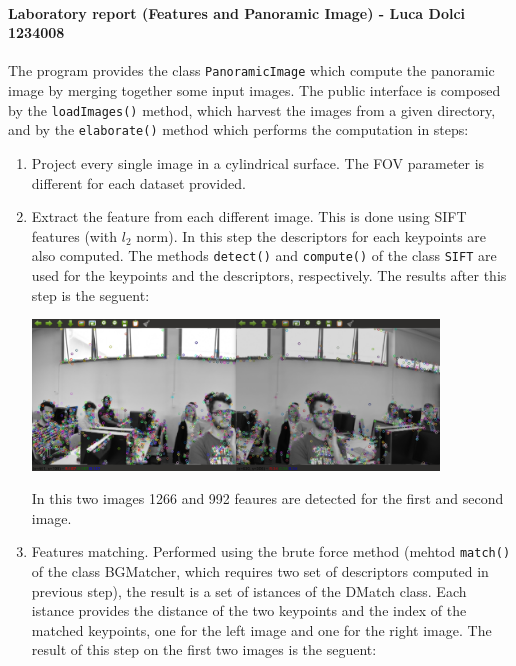 \documentclass[11pt, a4paper]{toptesi}
\begin{document}
\paragraph{Laboratory report (Features and Panoramic Image) - Luca Dolci 1234008}
The program provides the class \texttt{PanoramicImage} which compute the 
panoramic image by merging together some input images. The public
interface is composed by the \texttt{loadImages()} method, which
harvest the images from a given directory, and by the
\texttt{elaborate()} method which performs the computation in steps:
\begin{enumerate}
    \item Project every single image in a cylindrical surface. The FOV parameter
        is different for each dataset provided.
    \item Extract the feature from each different image. This is done using 
        SIFT features (with $l_2$ norm). In this step the descriptors for each
        keypoints are also computed. The methods \texttt{detect()} and
        \texttt{compute()} of the class \texttt{SIFT} are used for
        the keypoints and the descriptors, respectively. The results after this
        step is the seguent:
         \begin{center}
             \includegraphics[width=0.85\textwidth]{features.png}
        \end{center}
        In this two images 1266 and 992 feaures are detected for the first and
        second image.
    \item Features matching. Performed using the brute force method (mehtod
        \texttt{match()} of the class BGMatcher, which requires two set
        of descriptors computed in previous step), the result is a set of istances of
        the DMatch class. Each istance provides the distance of the two
        keypoints and the index of the matched keypoints, one for the left image
        and one for the right image. The result of this step on the first two
        images is the seguent:
         \begin{center}

\end{center}
\end{enumerate}
\end{document}
